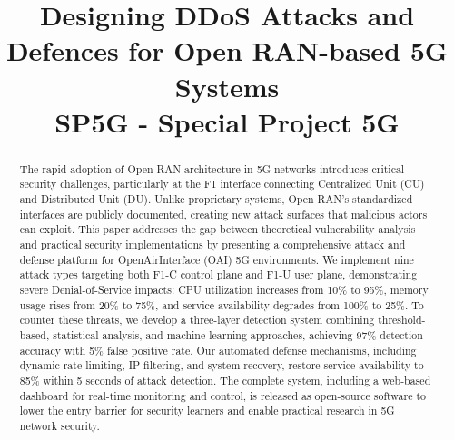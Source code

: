 \documentclass[conference]{IEEEtran}
\begin{document}
\title{Designing DDoS Attacks and Defences for Open RAN-based 5G Systems\\
{\footnotesize SP5G - Special Project 5G}}

\author{
\and
{}
}

\maketitle

\begin{abstract}
The rapid adoption of Open RAN architecture in 5G networks introduces critical security challenges, particularly at the F1 interface connecting Centralized Unit (CU) and Distributed Unit (DU). Unlike proprietary systems, Open RAN's standardized interfaces are publicly documented, creating new attack surfaces that malicious actors can exploit. This paper addresses the gap between theoretical vulnerability analysis and practical security implementations by presenting a comprehensive attack and defense platform for OpenAirInterface (OAI) 5G environments. We implement nine attack types targeting both F1-C control plane and F1-U user plane, demonstrating severe Denial-of-Service impacts: CPU utilization increases from 10\% to 95\%, memory usage rises from 20\% to 75\%, and service availability degrades from 100\% to 25\%. To counter these threats, we develop a three-layer detection system combining threshold-based, statistical analysis, and machine learning approaches, achieving 97\% detection accuracy with 5\% false positive rate. Our automated defense mechanisms, including dynamic rate limiting, IP filtering, and system recovery, restore service availability to 85\% within 5 seconds of attack detection. The complete system, including a web-based dashboard for real-time monitoring and control, is released as open-source software to lower the entry barrier for security learners and enable practical research in 5G network security.
\end{abstract}
\end{document}
